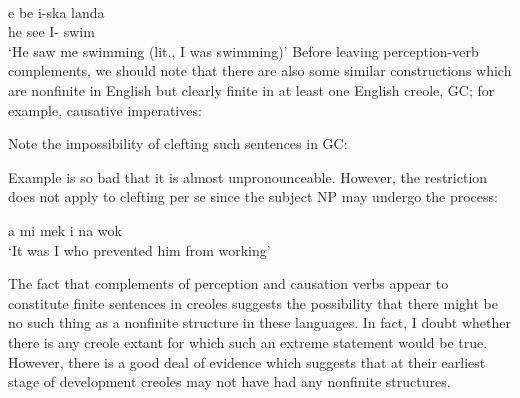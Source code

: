 \ea\label{ex:2:152}
\langinfo{\langST}{}{}\\
\gll e be i-ska landa\\
he see {I-\ASP} swim\\
\glt `He saw me swimming (lit., I was swimming)'
\z
Before leaving perception-verb complements, we should note that there are also some similar constructions which are nonfinite in English but clearly finite in at least one English creole, GC; for example, causative imperatives:

\z

\z

\z

\z

\noindent Note the impossibility of clefting such sentences in GC:


\z

\z

\z

\z

Example  is so bad that it is almost unpronounceable. However, the restriction does not apply to clefting per se since the subject NP may undergo the process:

\ea a mi mek i na wok\\
\glt `It was I who prevented him from working'
\label{ex:2:161}
\z

The fact that complements of perception and causation verbs appear to constitute finite sentences in creoles suggests the possibility that there might be no such thing as a nonfinite structure in these languages. In fact, I doubt whether there is any creole extant for which such an extreme statement would be true. However, there is a good deal of evidence which suggests that at their earliest stage of develop\-ment creoles may not have had any nonfinite structures.\\\\

